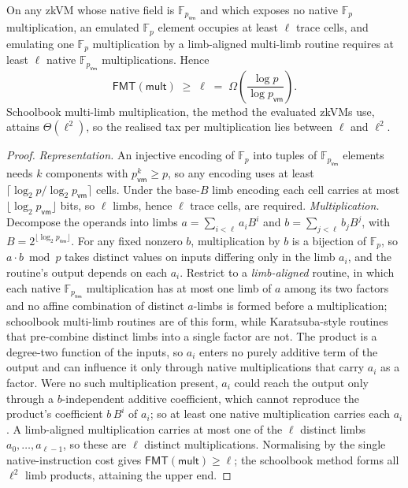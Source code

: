 \begin{proposition}\label{prop:fmt-lb}
On any zkVM whose native field is $\mathbb{F}_{p_{\mathsf{vm}}}$ and which exposes no native $\mathbb{F}_p$ multiplication, an emulated $\mathbb{F}_p$ element occupies at least $\ell$ trace cells, and emulating one $\mathbb{F}_p$ multiplication by a limb-aligned multi-limb routine requires at least $\ell$ native $\mathbb{F}_{p_{\mathsf{vm}}}$ multiplications. Hence
\begin{equation*}
  \mathsf{FMT}(\mathsf{mult}) \;\ge\; \ell \;=\; \Omega\!\left(\frac{\log p}{\log p_{\mathsf{vm}}}\right).
\end{equation*}
Schoolbook multi-limb multiplication, the method the evaluated zkVMs use, attains $\Theta(\ell^2)$, so the realised tax per multiplication lies between $\ell$ and $\ell^2$.
\end{proposition}

\begin{proof}
\emph{Representation.} An injective encoding of $\mathbb{F}_p$ into tuples of $\mathbb{F}_{p_{\mathsf{vm}}}$ elements needs $k$ components with $p_{\mathsf{vm}}^{k}\ge p$, so any encoding uses at least $\lceil\log_2 p/\log_2 p_{\mathsf{vm}}\rceil$ cells. Under the base-$B$ limb encoding each cell carries at most $\lfloor\log_2 p_{\mathsf{vm}}\rfloor$ bits, so $\ell$ limbs, hence $\ell$ trace cells, are required. \emph{Multiplication.} Decompose the operands into limbs $a=\sum_{i<\ell}a_i B^i$ and $b=\sum_{j<\ell}b_j B^j$, with $B=2^{\lfloor\log_2 p_{\mathsf{vm}}\rfloor}$. For any fixed nonzero $b$, multiplication by $b$ is a bijection of $\mathbb{F}_p$, so $a\cdot b\bmod p$ takes distinct values on inputs differing only in the limb $a_i$, and the routine's output depends on each $a_i$. Restrict to a \emph{limb-aligned} routine, in which each native $\mathbb{F}_{p_{\mathsf{vm}}}$ multiplication has at most one limb of $a$ among its two factors and no affine combination of distinct $a$-limbs is formed before a multiplication; schoolbook multi-limb routines are of this form, while Karatsuba-style routines that pre-combine distinct limbs into a single factor are not. The product is a degree-two function of the inputs, so $a_i$ enters no purely additive term of the output and can influence it only through native multiplications that carry $a_i$ as a factor. Were no such multiplication present, $a_i$ could reach the output only through a $b$-independent additive coefficient, which cannot reproduce the product's coefficient $b\,B^i$ of $a_i$; so at least one native multiplication carries each $a_i$. A limb-aligned multiplication carries at most one of the $\ell$ distinct limbs $a_0,\dots,a_{\ell-1}$, so these are $\ell$ distinct multiplications. Normalising by the single native-instruction cost gives $\mathsf{FMT}(\mathsf{mult})\ge\ell$; the schoolbook method forms all $\ell^2$ limb products, attaining the upper end.
\end{proof}

